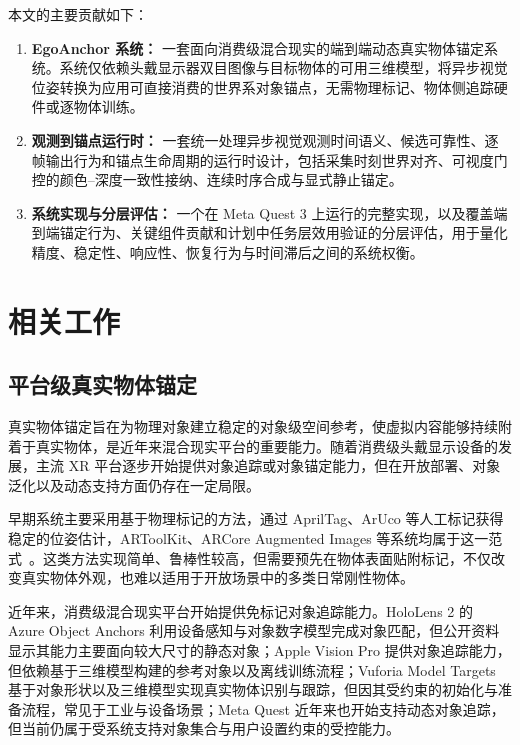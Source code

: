 \documentclass[review]{vgtc}
\begin{document}
本文的主要贡献如下：

\begin{enumerate}
  \item \textbf{EgoAnchor 系统：} 一套面向消费级混合现实的端到端动态真实物体锚定系统。系统仅依赖头戴显示器双目图像与目标物体的可用三维模型，将异步视觉位姿转换为应用可直接消费的世界系对象锚点，无需物理标记、物体侧追踪硬件或逐物体训练。
  \item \textbf{观测到锚点运行时：} 一套统一处理异步视觉观测时间语义、候选可靠性、逐帧输出行为和锚点生命周期的运行时设计，包括采集时刻世界对齐、可视度门控的颜色--深度一致性接纳、连续时序合成与显式静止锚定。
  \item \textbf{系统实现与分层评估：} 一个在 Meta Quest 3 上运行的完整实现，以及覆盖端到端锚定行为、关键组件贡献和计划中任务层效用验证的分层评估，用于量化精度、稳定性、响应性、恢复行为与时间滞后之间的系统权衡。
\end{enumerate}

\section{相关工作}\label{sec:related-work}


\subsection{平台级真实物体锚定}


真实物体锚定旨在为物理对象建立稳定的对象级空间参考，使虚拟内容能够持续附着于真实物体，是近年来混合现实平台的重要能力。随着消费级头戴显示设备的发展，主流 XR 平台逐步开始提供对象追踪或对象锚定能力，但在开放部署、对象泛化以及动态支持方面仍存在一定局限。

早期系统主要采用基于物理标记的方法，通过 AprilTag、ArUco 等人工标记获得稳定的位姿估计，ARToolKit、ARCore Augmented Images 等系统均属于这一范式~\cite{kato1999artoolkit,olson2011apriltag,garridojurado2014aruco,googleArcoreAugmentedImages}。这类方法实现简单、鲁棒性较高，但需要预先在物体表面贴附标记，不仅改变真实物体外观，也难以适用于开放场景中的多类日常刚性物体。

近年来，消费级混合现实平台开始提供免标记对象追踪能力。HoloLens 2 的 Azure Object Anchors 利用设备感知与对象数字模型完成对象匹配，但公开资料显示其能力主要面向较大尺寸的静态对象；Apple Vision Pro 提供对象追踪能力，但依赖基于三维模型构建的参考对象以及离线训练流程；Vuforia Model Targets 基于对象形状以及三维模型实现真实物体识别与跟踪，但因其受约束的初始化与准备流程，常见于工业与设备场景；Meta Quest 近年来也开始支持动态对象追踪，但当前仍属于受系统支持对象集合与用户设置约束的受控能力。
\end{document}
